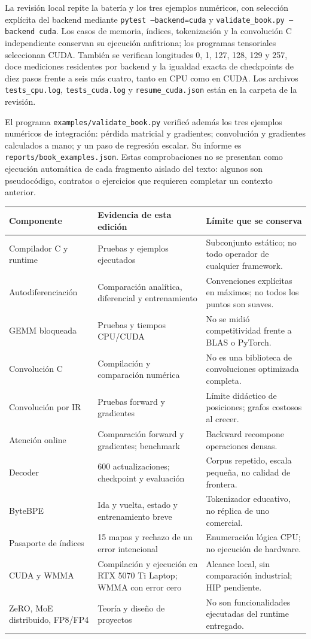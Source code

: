\documentclass[12pt,a4paper,oneside]{report}
\begin{document}
La revisión local repite la batería y los tres ejemplos numéricos, con selección explícita del backend mediante \texttt{pytest --backend=cuda} y \texttt{validate\_book.py --backend cuda}. Los casos de memoria, índices, tokenización y la convolución C independiente conservan su ejecución anfitriona; los programas tensoriales seleccionan CUDA. También se verifican longitudes 0, 1, 127, 128, 129 y 257, doce mediciones residentes por backend y la igualdad exacta de checkpoints de diez pasos frente a seis más cuatro, tanto en CPU como en CUDA. Los archivos \texttt{tests\_cpu.log}, \texttt{tests\_cuda.log} y \texttt{resume\_cuda.json} están en la carpeta de la revisión.

El programa \texttt{examples/validate\_book.py} verificó además los tres ejemplos numéricos de integración: pérdida matricial y gradientes; convolución y gradientes calculados a mano; y un paso de regresión escalar. Su informe es \texttt{reports/book\_examples.json}. Estas comprobaciones no se presentan como ejecución automática de cada fragmento aislado del texto: algunos son pseudocódigo, contratos o ejercicios que requieren completar un contexto anterior.

\begin{longtable}{@{}P{.27\textwidth}P{.29\textwidth}P{.38\textwidth}@{}}
\toprule
\textbf{Componente} & \textbf{Evidencia de esta edición} & \textbf{Límite que se conserva}\\\midrule\endhead
Compilador C y runtime & Pruebas y ejemplos ejecutados & Subconjunto estático; no todo operador de cualquier framework.\\
Autodiferenciación & Comparación analítica, diferencial y entrenamiento & Convenciones explícitas en máximos; no todos los puntos son suaves.\\
GEMM bloqueada & Pruebas y tiempos CPU/CUDA & No se midió competitividad frente a BLAS o PyTorch.\\
Convolución C & Compilación y comparación numérica & No es una biblioteca de convoluciones optimizada completa.\\
Convolución por IR & Pruebas forward y gradientes & Límite didáctico de posiciones; grafos costosos al crecer.\\
Atención online & Comparación forward y gradientes; benchmark & Backward recompone operaciones densas.\\
Decoder & 600 actualizaciones; checkpoint y evaluación & Corpus repetido, escala pequeña, no calidad de frontera.\\
ByteBPE & Ida y vuelta, estado y entrenamiento breve & Tokenizador educativo, no réplica de uno comercial.\\
Pasaporte de índices & 15 mapas y rechazo de un error intencional & Enumeración lógica CPU; no ejecución de hardware.\\
CUDA y WMMA & Compilación y ejecución en RTX 5070 Ti Laptop; WMMA con error cero & Alcance local, sin comparación industrial; HIP pendiente.\\
ZeRO, MoE distribuido, FP8/FP4 & Teoría y diseño de proyectos & No son funcionalidades ejecutadas del runtime entregado.\\
\bottomrule
\end{longtable}
\end{document}
